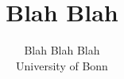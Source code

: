 \documentclass{article}
\title{Blah Blah}
\author{Blah Blah Blah\\ University of Bonn}
\theoremstyle{definition}
\theoremstyle{plain}
\begin{document}
\maketitle
\tableofcontents        %

\clearpage






\clearpage
\nocite{*}              %
\printbibliography      %
\end{document}
